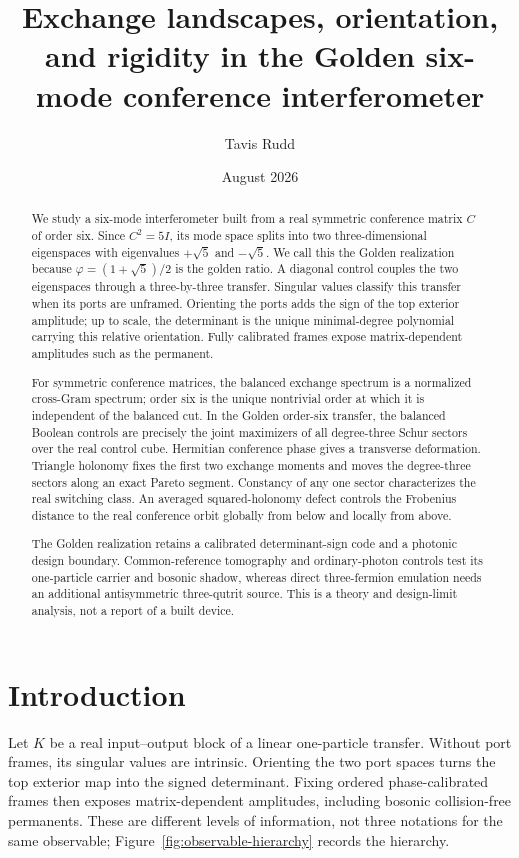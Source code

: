 \documentclass[11pt]{article}
\title{Exchange landscapes, orientation, and rigidity in the Golden six-mode conference interferometer}
\author{Tavis Rudd}
\date{August 2026}
\theoremstyle{remark}
\begin{document}
\maketitle

\begin{abstract}
We study a six-mode interferometer built from a real symmetric conference
matrix \(C\) of order six.  Since \(C^2=5I\), its mode space splits into two
three-dimensional eigenspaces with eigenvalues \(+\sqrt5\) and \(-\sqrt5\).
We call this the Golden realization because
\(\varphi=(1+\sqrt5)/2\) is the golden ratio.  A diagonal control couples the
two eigenspaces through a three-by-three transfer.  Singular values classify
this transfer when its ports are unframed.  Orienting the ports adds the sign
of the top exterior amplitude; up to scale, the determinant is the unique
minimal-degree polynomial carrying this relative orientation.  Fully
calibrated frames expose matrix-dependent amplitudes such as the permanent.

For symmetric conference matrices, the balanced exchange spectrum is a
normalized cross-Gram spectrum; order six is the unique nontrivial order at
which it is independent of the balanced cut.  In the Golden order-six
transfer, the balanced Boolean controls are precisely the joint maximizers of
all degree-three Schur sectors over the real control cube.  Hermitian
conference phase gives a transverse deformation.  Triangle holonomy fixes the
first two exchange moments and moves the degree-three sectors along an exact
Pareto segment.  Constancy of any one sector characterizes the real switching
class.  An averaged squared-holonomy defect controls the Frobenius
distance to the real conference orbit globally from below and locally from
above.

The Golden realization retains a calibrated determinant-sign code and a
photonic design boundary.  Common-reference tomography and ordinary-photon
controls test its one-particle carrier and bosonic shadow, whereas direct
three-fermion emulation needs an additional antisymmetric three-qutrit source.
This is a theory and design-limit analysis, not a report of a built device.
\end{abstract}

\section{Introduction}

Let \(K\) be a real input--output block of a linear one-particle transfer.
Without port frames, its singular values are intrinsic.  Orienting the two
port spaces turns the top exterior map into the signed determinant.  Fixing
ordered phase-calibrated frames then exposes matrix-dependent amplitudes,
including bosonic collision-free permanents.  These are different levels of
information, not three notations for the same observable;
Figure~\ref{fig:observable-hierarchy} records the hierarchy.
\end{document}
